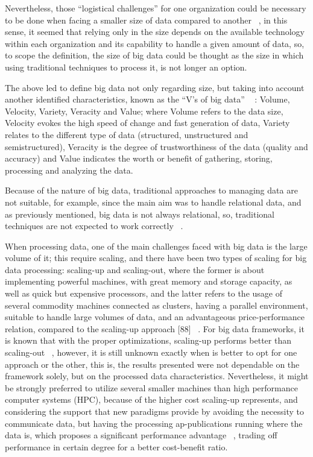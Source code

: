 Nevertheless, those “logistical challenges” for one organization could be necessary
to be done when facing a smaller size of data compared to another ~\cite{Magoulas2009}, in this sense, it seemed that relying only in the size depends on the available technology within each organization and its capability to handle a given amount of data, so, to scope the definition, the size of big data could be thought as the size in which using traditional
techniques to process it, is not longer an option. 

The above led to define big data not only regarding size, but taking into account
another identified characteristics, known as the “V’s of big data” ~\cite{Marr2015} : Volume, Velocity, Variety, Veracity and Value; where Volume refers to the data size, 
Velocity evokes the high speed of change and fast generation of data, Variety relates to the different type of data (structured, unstructured and semistructured), 
Veracity is the degree of trustworthiness of the data (quality and accuracy) and Value indicates the
worth or benefit of gathering, storing, processing and analyzing the data.

Because of the nature of big data, traditional approaches to managing data are not
suitable, for example, since the main aim was to handle relational data, and as previously mentioned,  big data is not always relational, so, traditional techniques are not expected to work correctly ~\cite{FUJITSU2015}. 

When processing data, one of the main challenges faced with big data is the large volume of it; this require scaling, and there have been two types of scaling for big data processing: scaling-up and scaling-out, where the former is about implementing powerful machines, with great memory and storage capacity, as well as quick but expensive processors, and the latter refers to the usage of several commodity machines connected as clusters, having a parallel environment, suitable to handle large volumes of data, and an advantageous price-performance relation, compared to the scaling-up approach [88] ~\cite{FUJITSU2015}. For big data frameworks, it is known that with the proper optimizations, scaling-up performs better than scaling-out ~\cite{Appuswamy2013}, however, it is still unknown exactly when is better to opt for one approach or the other,
this is, the results presented were not dependable on the framework solely, but on the
processed data characteristics. Nevertheless, it might be strongly preferred to utilize
several smaller machines than high performance computer systems (HPC), because of
the higher cost scaling-up represents, and considering the support that new paradigms
provide by avoiding the necessity to communicate data, but having the processing ap-publications running where the data is, which proposes a significant performance advantage ~\cite{Tekiner2013}, trading off performance in certain degree for a better cost-benefit ratio.


